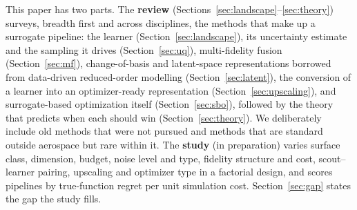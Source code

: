 This paper has two parts. The \textbf{review} (Sections~\ref{sec:landscape}--\ref{sec:theory}) surveys, breadth first and
across disciplines, the methods that make up a surrogate pipeline: the learner (Section~\ref{sec:landscape}), its
uncertainty estimate and the sampling it drives (Section~\ref{sec:uq}), multi-fidelity fusion (Section~\ref{sec:mf}),
change-of-basis and latent-space representations borrowed from data-driven reduced-order modelling
(Section~\ref{sec:latent}), the conversion of a learner into an optimizer-ready representation
(Section~\ref{sec:upscaling}), and surrogate-based optimization itself (Section~\ref{sec:sbo}), followed by the theory
that predicts when each should win (Section~\ref{sec:theory}). We deliberately include old methods that were not pursued
and methods that are standard outside aerospace but rare within it. The \textbf{study} (in preparation) varies surface
class, dimension, budget, noise level and type, fidelity structure and cost, scout--learner pairing, upscaling and
optimizer type in a factorial design, and scores pipelines by true-function regret per unit simulation cost.
Section~\ref{sec:gap} states the gap the study fills.

